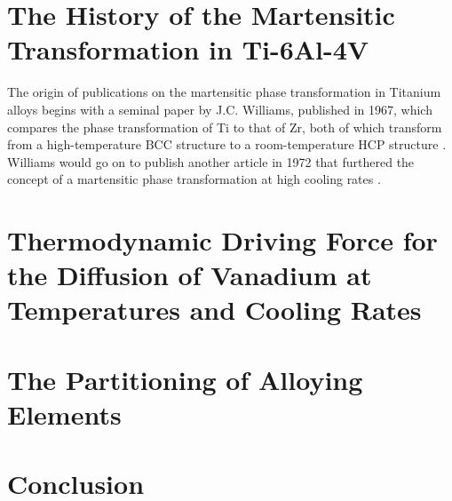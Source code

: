 \documentclass[nofootinbib,notitlepage]{revtex4-1}
\begin{document}
\section{The History of the Martensitic Transformation in Ti-6Al-4V}
The origin of publications on the martensitic phase transformation in Titanium alloys begins with a seminal paper by J.C. Williams, published in 1967, which compares the phase transformation of Ti to that of Zr, both of which transform from a high-temperature BCC structure to a room-temperature HCP structure \cite{Williams1967}. Williams would go on to publish another article in 1972 that furthered the concept of a martensitic phase transformation at high cooling rates \cite{Williams1972}. 

\section{Thermodynamic Driving Force for the Diffusion of Vanadium at Temperatures and Cooling Rates}

\section{The Partitioning of Alloying Elements}

\section{Conclusion}


\end{document}
